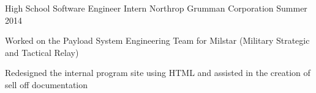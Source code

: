 \begin{cventries}
  \cventry
    {High School Software Engineer Intern} %
    {Northrop Grumman Corporation} %
    {Summer 2014} %
    {} %
    {
      \begin{cvitems} %
        \item {Worked on the Payload System Engineering Team for Milstar (Military Strategic and Tactical Relay)}
        \item {Redesigned the internal program site using HTML and assisted in the creation of sell off documentation}
      \end{cvitems}
    }

\end{cventries}
